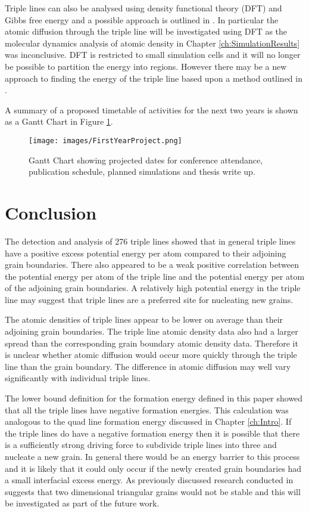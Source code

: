 \documentclass[12pt,a4paper,openany]{report}
\begin{document}
Triple lines can also be analysed using density functional theory (DFT) and Gibbs free energy and a possible approach is outlined in \cite{HASHIBON2010939}. In particular the atomic diffusion through the triple line will be investigated using DFT as the molecular dynamics analysis of atomic density in Chapter \ref{ch:SimulationResults} was inconclusive. DFT is restricted to small simulation cells and it will no longer be possible to partition the energy into regions. However there may be a new approach to finding the energy of the triple line based upon a method outlined in \cite{Lee2004}. 

A summary of a proposed timetable of activities for the next two years is shown as a Gantt Chart in Figure \ref{fig:Gantt}.

\begin{figure}[H]
	\texttt{[image: images/FirstYearProject.png]} 
	\caption{Gantt Chart showing projected dates for conference attendance, publication schedule, planned simulations and thesis write up.}  
	\label{fig:Gantt}
\end{figure}

\newpage 
\section{Conclusion}

The detection and analysis of 276 triple lines showed that in general triple lines have a positive excess potential energy per atom compared to their adjoining grain boundaries. There also appeared to be a weak positive correlation between the potential energy per atom of the triple line and the potential energy per atom of the adjoining grain boundaries. A relatively high potential energy in the triple line may suggest that triple lines are a preferred site for nucleating new grains. 

The atomic densities of triple lines appear to be lower on average than their adjoining grain boundaries. The triple line atomic density data also had a larger spread than the corresponding grain boundary atomic density data. Therefore it is unclear whether atomic diffusion would occur more quickly through the triple line than the grain boundary. The difference in atomic diffusion may well vary significantly with individual triple lines.

The lower bound definition for the formation energy defined in this paper showed that all the triple lines have negative formation energies. This calculation was analogous to the quad line formation energy discussed in Chapter \ref{ch:Intro}. If the triple lines do have a negative formation energy then it is possible that there is a sufficiently strong driving force to subdivide triple lines into three and nucleate a new grain. In general there would be an energy barrier to this process and it is likely that it could only occur if the newly created grain boundaries had a small interfacial excess energy. As previously discussed research conducted in \cite{Shvindlerman2005} suggests that two dimensional triangular grains would not be stable and this will be investigated as part of the future work.
\end{document}

